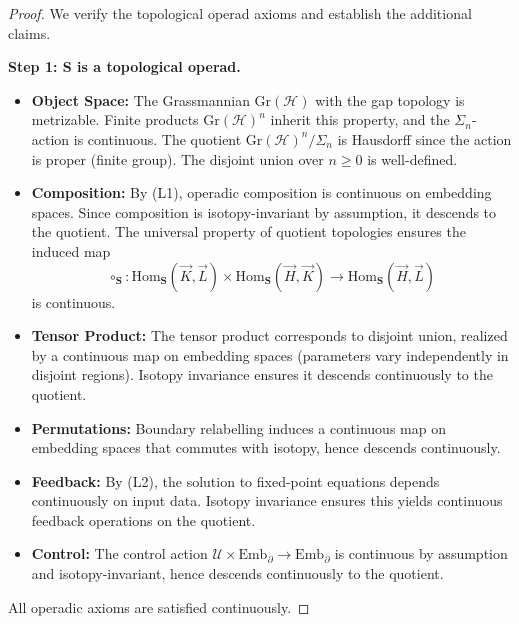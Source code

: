 \documentclass[11pt]{article}
\begin{document}
\begin{proof}
We verify the topological operad axioms and establish the additional claims.

\medskip\noindent
\textbf{Step 1: $\mathbf{S}$ is a topological operad.}

\begin{itemize}
    \item \textbf{Object Space:} The Grassmannian $\mathrm{Gr}(\mathcal{H})$ with the gap topology is metrizable. Finite products $\mathrm{Gr}(\mathcal{H})^n$ inherit this property, and the $\Sigma_n$-action is continuous. The quotient $\mathrm{Gr}(\mathcal{H})^n/\Sigma_n$ is Hausdorff since the action is proper (finite group). The disjoint union over $n \geq 0$ is well-defined.

    \item \textbf{Composition:} By (L1), operadic composition is continuous on embedding spaces. Since composition is isotopy-invariant by assumption, it descends to the quotient. The universal property of quotient topologies ensures the induced map
    \[
    \circ_{\mathbf{S}} : \mathrm{Hom}_{\mathbf{S}}(\vec{K}, \vec{L}) \times \mathrm{Hom}_{\mathbf{S}}(\vec{H}, \vec{K}) \to \mathrm{Hom}_{\mathbf{S}}(\vec{H}, \vec{L})
    \]
    is continuous.

    \item \textbf{Tensor Product:} The tensor product corresponds to disjoint union, realized by a continuous map on embedding spaces (parameters vary independently in disjoint regions). Isotopy invariance ensures it descends continuously to the quotient.

    \item \textbf{Permutations:} Boundary relabelling induces a continuous map on embedding spaces that commutes with isotopy, hence descends continuously.

    \item \textbf{Feedback:} By (L2), the solution to fixed-point equations depends continuously on input data. Isotopy invariance ensures this yields continuous feedback operations on the quotient.

    \item \textbf{Control:} The control action $\mathcal{U} \times \mathrm{Emb}_\partial \to \mathrm{Emb}_\partial$ is continuous by assumption and isotopy-invariant, hence descends continuously to the quotient.
\end{itemize}

All operadic axioms are satisfied continuously.


\end{proof}
\end{document}
